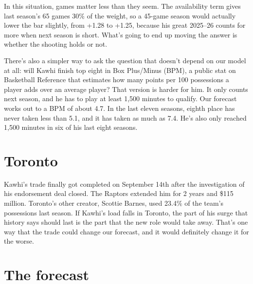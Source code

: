 \documentclass[11pt]{article}
\begin{document}
In this situation, games matter less than they seem. The availability term gives last season's 65
games 30\% of the weight, so a 45-game season would actually lower the bar slightly, from +1.28 to
+1.25, because his great 2025--26 counts for more when next season is short. What's going to end up
moving the answer is whether the shooting holds or not.

There's also a simpler way to ask the question that doesn't depend on our model at all: will Kawhi
finish top eight in Box Plus/Minus (BPM), a public stat on Basketball Reference that estimates how
many points per 100 possessions a player adds over an average player? That version is harder for
him. It only counts next season, and he has to play at least 1,500 minutes to qualify. Our forecast
works out to a BPM of about 4.7. In the last eleven seasons, eighth place has never taken less than
5.1, and it has taken as much as 7.4. He's also only reached 1,500 minutes in six of his last eight
seasons.

\section*{Toronto}

Kawhi's trade finally got completed on September 14th after the investigation of his endorsement
deal closed. The Raptors
extended him for 2 years and \$115
million.
Toronto's other creator, Scottie Barnes, used 23.4\% of the team's possessions last season. If
Kawhi's load falls in Toronto, the part of his surge that history says should last is the part that
the new role would take away. That's one way that the trade could change our forecast, and it
would definitely change it for the worse.

\section*{The forecast}

\forecastscale
{}
\end{document}
